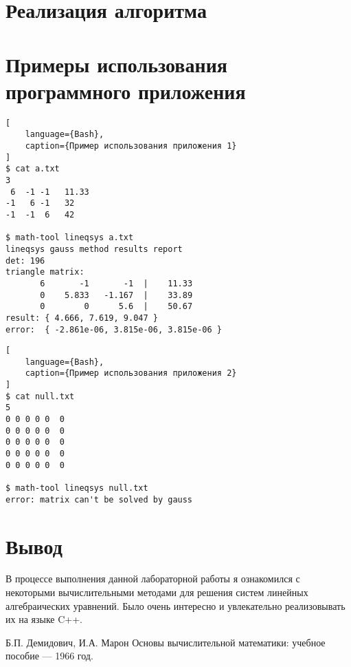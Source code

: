 \documentclass{article}
\begin{document}
\section{Реализация алгоритма}



\section{Примеры использования программного приложения}
\begin{lstlisting}[
    language={Bash},
    caption={Пример использования приложения 1}
]
$ cat a.txt
3
 6  -1 -1   11.33
-1   6 -1   32
-1  -1  6   42

$ math-tool lineqsys a.txt
lineqsys gauss method results report
det: 196
triangle matrix:
       6       -1       -1  |    11.33
       0    5.833   -1.167  |    33.89
       0        0      5.6  |    50.67
result: { 4.666, 7.619, 9.047 }
error:  { -2.861e-06, 3.815e-06, 3.815e-06 }
\end{lstlisting}

\begin{lstlisting}[
    language={Bash},
    caption={Пример использования приложения 2}
]
$ cat null.txt
5
0 0 0 0 0  0
0 0 0 0 0  0
0 0 0 0 0  0
0 0 0 0 0  0
0 0 0 0 0  0

$ math-tool lineqsys null.txt
error: matrix can't be solved by gauss
\end{lstlisting}

\section{Вывод}
В процессе выполнения данной лабораторной работы я 
ознакомился с некоторыми вычислительными методами для
решения систем линейных алгебраических уравнений.
Было очень интересно и увлекательно реализовывать их
на языке C++.

\begin{thebibliography}{9}

    Б.П. Демидович, И.А. Марон Основы вычислительной математики:
    учебное пособие — 1966 год.

\end{thebibliography}
\end{document}
